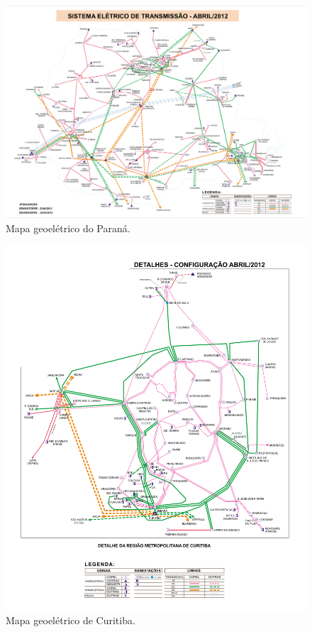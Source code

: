 \documentclass[aprovado,numbers]{coppe}
\begin{document}
  \begin{figure}[H]
  \includegraphics[width=1\linewidth]{img/mapa_geoeletrico_parana} \caption{Mapa geoelétrico do Paraná.}\label{fig:unnamed-chunk-5}
  \end{figure}
  \begin{figure}[H]
  \includegraphics[width=1\linewidth]{img/mapa_geoeletrico_curitiba} \caption{Mapa geoelétrico de Curitiba.}\label{fig:unnamed-chunk-6}
  \end{figure}
\end{document}
